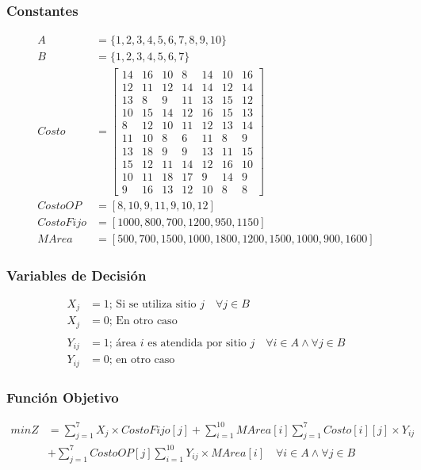 \documentclass[a4paper,12pt]{article}
\begin{document}
\subsubsection{Constantes}
\begin{equation*}
\begin{split}
	A&=\{1,2,3,4,5,6,7,8,9,10\}\\
	B&=\{1,2,3,4,5,6,7\}\\
	Costo &= \begin{bmatrix}
	14 & 16 & 10 & 8 & 14 & 10 & 16\\
	12 & 11 & 12 & 14 & 14 & 12 & 14\\
	13 & 8 & 9 & 11 & 13 & 15 & 12\\
	10 & 15 & 14 & 12 & 16 & 15 & 13\\
	8 & 12 & 10 & 11 & 12 & 13 & 14\\
	11 & 10 & 8 & 6 & 11 & 8 & 9\\
	13 & 18 & 9 & 9 & 13 & 11 & 15\\
	15 & 12 & 11 & 14 & 12 & 16 & 10\\
	10 & 11 & 18 & 17 & 9 & 14 & 9\\
	9 & 16 & 13 & 12 & 10 & 8 & 8
	\end{bmatrix}\\
	CostoOP&=[8,10,9,11,9,10,12]\\
	CostoFijo&=[1000,800,700,1200,950,1150]\\
	MArea&=[500,700,1500,1000,1800,1200,1500,1000,900,1600]
\end{split}
\end{equation*}
\subsubsection{Variables de Decisión}
\begin{equation*}
\begin{split}
	X_j&=1 \text{; Si se utiliza sitio }j\quad \forall j \in B\\
	X_j&=0 \text{; En otro caso}\\\\
	Y_{ij}&=1 \text{; área } i \text{ es atendida por sitio }j\quad \forall i \in A \wedge \forall j \in B\\
	Y_{ij}&=0 \text{; en otro caso}
\end{split}
\end{equation*}
\subsubsection{Función Objetivo}
\begin{equation*}
\begin{split}
	minZ&=\sum_{j=1}^{7}X_j\times CostoFijo[j]+\sum_{i=1}^{10}MArea[i]\sum_{j=1}^{7}Costo[i][j]\times Y_{ij}\\
	&+\sum_{j=1}^{7}CostoOP[j]\sum_{i=1}^{10}Y_{ij}\times MArea[i] \quad \forall i \in A \wedge \forall j \in B
\end{split}
\end{equation*}
\end{document}
